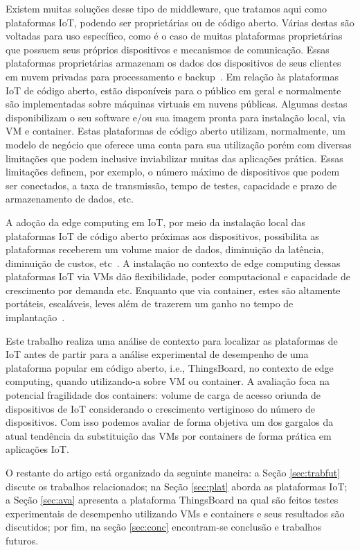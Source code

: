 \documentclass{sbrt}
\begin{document}
Existem muitas soluções desse tipo de middleware, que tratamos aqui como plataformas IoT, podendo ser proprietárias ou de código aberto. Várias destas são voltadas para uso específico, como é o caso de muitas plataformas proprietárias que possuem seus próprios dispositivos e mecanismos de comunicação. Essas plataformas proprietárias armazenam os dados dos dispositivos de seus clientes em nuvem privadas para processamento e backup~\cite{ganguly2016selecting}. Em relação às plataformas IoT de código aberto, estão disponíveis para o público em geral e normalmente são implementadas sobre máquinas virtuais em nuvens públicas. Algumas destas disponibilizam o seu software e/ou sua imagem pronta para instalação local, via VM e container. Estas plataformas de código aberto utilizam, normalmente, um modelo de negócio que oferece uma conta para sua utilização porém com diversas limitações que podem inclusive inviabilizar muitas das aplicações prática. Essas limitações definem, por exemplo, o número máximo de dispositivos que podem ser conectados, a taxa de transmissão, tempo de testes, capacidade e prazo de armazenamento de dados, etc.

A adoção da edge computing em IoT, por meio da instalação local das plataformas IoT de código aberto próximas aos dispositivos, possibilita as plataformas receberem um volume maior de dados, diminuição da latência, diminuição de custos, etc~\cite{qfan2018}. A instalação no contexto de edge computing dessas plataformas IoT via VMs dão flexibilidade, poder computacional e capacidade de crescimento por demanda etc. Enquanto que via container, estes são altamente portáteis, escaláveis, leves além de trazerem um ganho no tempo de implantação~\cite{santos2019avaliaccao, salah2017performance}. 

Este trabalho realiza uma análise de contexto para localizar as plataformas de IoT antes de partir para a análise experimental de desempenho de uma plataforma popular em código aberto, i.e., ThingsBoard, no contexto de edge computing, quando utilizando-a sobre VM ou container. A avaliação foca na potencial fragilidade dos containers: volume de carga de acesso oriunda de dispositivos de IoT considerando o crescimento vertiginoso do número de dispositivos. Com isso podemos avaliar de forma objetiva um dos gargalos da atual tendência da substituição das VMs por containers de forma prática em aplicações IoT. 

O restante do artigo está organizado da seguinte maneira: a Seção \ref{sec:trabfut} discute os trabalhos relacionados; na Seção \ref{sec:plat} aborda as plataformas IoT; a Seção \ref{sec:ava} apresenta a plataforma ThingsBoard na qual são feitos testes experimentais de desempenho utilizando VMs e containers e seus resultados são discutidos; por fim, na seção \ref{sec:conc} encontram-se conclusão e trabalhos futuros.
\end{document}
